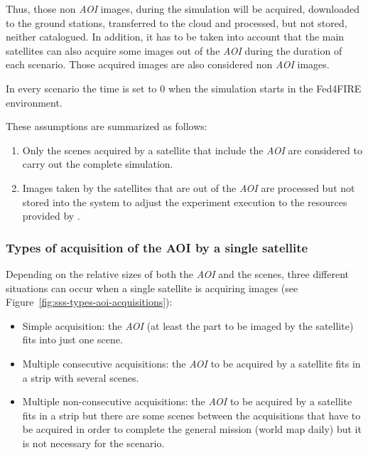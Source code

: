 Thus, those non \emph{AOI} images, during the simulation will be acquired,
downloaded to the ground stations, transferred to the cloud and processed, but
not stored, neither catalogued. In addition, it has to be taken into account
that the main satellites can also acquire some images out of the \emph{AOI}
during the duration of each scenario. Those acquired images are also considered
non \emph{AOI} images.

In every scenario the time is set to 0 when the simulation starts in the Fed4FIRE environment.

These assumptions are summarized as follows:
\begin{enumerate}
\item Only the scenes acquired by a satellite that include the \emph{AOI} are considered to carry out the complete simulation.
\item Images taken by the satellites that are out of the \emph{AOI} are processed but
  not stored into the system to adjust the experiment execution to the resources
  provided by \bonfire.
\end{enumerate}

\subsubsection{Types of acquisition of the AOI by a single satellite}
\label{subsubsec:types-acquisition}

Depending on the relative sizes of both the \emph{AOI} and the scenes, three different
situations can occur when a single satellite is acquiring images (see Figure~\ref{fig:sss-types-aoi-acquisitions}):
\begin{itemize}
\item Simple acquisition: the \emph{AOI} (at least the part to be imaged by the
  satellite) fits into just one scene.

\item Multiple consecutive acquisitions: the \emph{AOI} to be acquired by a satellite
fits in a strip with several scenes.

\item Multiple non-consecutive acquisitions: the \emph{AOI} to be acquired by a
  satellite fits in a strip but there are some scenes between the acquisitions
  that have to be acquired in order to complete the general mission (world map
  daily) but it is not necessary for the scenario.
\end{itemize}

